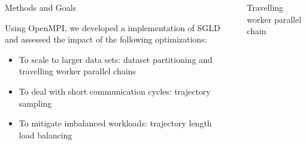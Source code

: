 \documentclass[final]{beamer}
\newlength{\sepwid}
\newlength{\onecolwid}
\newlength{\twocolwid}
\begin{document}
\begin{frame}[t]
\begin{columns}[t]
\begin{column}{\onecolwid}
\begin{block}{Methods and Goals}

  Using OpenMPI, we developed a implementation of SGLD and assessed the impact
  of the following optimizations:
  \begin{itemize}
    \item To scale to larger data sets: dataset partitioning and travelling worker parallel chains\citep{ahn2014distributed}
    \item To deal with short communication cycles: trajectory sampling\citep{ahn2014distributed}
    \item To mitigate imbalanced workloads: trajectory length load balancing\citep{ahn2014distributed}
  \end{itemize}

\end{block}




\end{column} %

\begin{column}{\sepwid}\end{column} %

\begin{column}{\twocolwid} %

\begin{columns}[t,totalwidth=\twocolwid] %

\begin{column}{\onecolwid}\vspace{-.6in} %


\begin{block}{Travelling worker parallel chain}


\end{block}
\end{column}
\end{columns}
\end{column}
\end{columns}
\end{frame}
\end{document}
